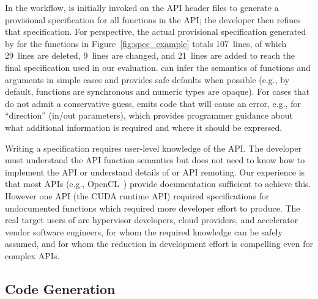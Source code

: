 {

In the \AvA workflow, \CAvA is initially invoked on the API header files to generate a provisional \Lapis specification for all functions in the API;
the developer then refines that specification.
For perspective,
the actual provisional specification generated by \CAvA for the functions in Figure~\ref{fig:spec_example} totals 107~lines,
of which 29~lines are deleted, 9~lines are changed, and 21~lines are added to reach the final specification used in our evaluation.
\CAvA can infer the semantics of functions and arguments in simple cases and provides safe defaults when possible (e.g., by default, functions are synchronous and numeric types are opaque).
For cases that do not admit a conservative guess, \CAvA emits code that will cause an error, e.g., for ``direction'' (in/out parameters),
which provides programmer guidance about what additional information is required and where it should be expressed.

Writing a \Lapis specification requires user-level knowledge of the API.
The developer must understand the API function semantics but does not need to know how to implement the API or understand details of \AvA or API remoting.
Our experience is that most APIs (e.g., OpenCL~\cite{opencl}) provide documentation sufficient to achieve this.
However one API (the CUDA runtime API)
required \Lapis specifications for undocumented functions which required more developer effort to produce. The real target users of \AvA
are hypervisor developers, cloud providers, and accelerator vendor software engineers, for whom the required knowledge can be safely assumed, and for whom
the reduction in development effort is compelling even for complex APIs.

\subsection{Code Generation}
\label{s:code_gen}


}
